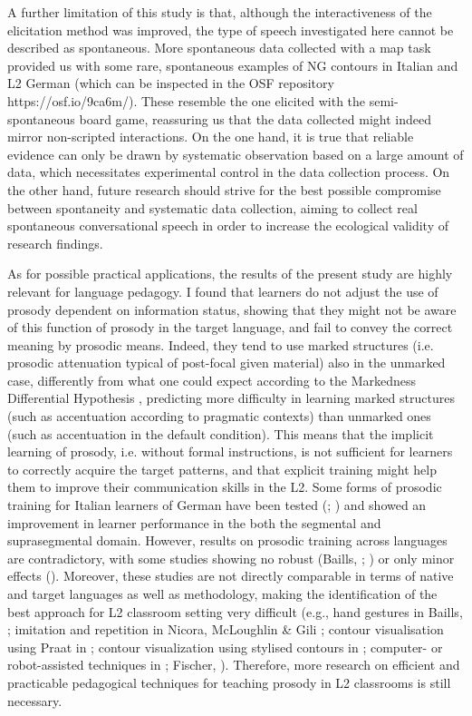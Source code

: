 A further limitation of this study is that, although the interactiveness of the elicitation method was improved, the type of speech investigated here cannot be described as spontaneous. More spontaneous data collected with a map task \citep{AndersonEtAl1991} provided us with some rare, spontaneous examples of NG contours in Italian and L2 German (which can be inspected in the OSF repository https://osf.io/9ca6m/). These resemble the one elicited with the semi-spontaneous board game, reassuring us that the data collected might indeed mirror non-scripted interactions. On the one hand, it is true that reliable evidence can only be drawn by systematic observation based on a large amount of data, which necessitates experimental control in the data collection process. On the other hand, future research should strive for the best possible compromise between spontaneity and systematic data collection, aiming to collect real spontaneous conversational speech in order to increase the ecological validity of research findings.

As for possible practical applications, the results of the present study are highly relevant for language pedagogy. I found that learners do not adjust the use of prosody dependent on information status, showing that they might not be aware of this function of prosody in the target language, and fail to convey the correct meaning by prosodic means. Indeed, they tend to use marked structures (i.e. prosodic attenuation typical of post-focal given material) also in the unmarked case, differently from what one could expect according to the Markedness Differential Hypothesis \citep{Eckman1977}, predicting more difficulty in learning marked structures (such as accentuation according to pragmatic contexts) than unmarked ones (such as accentuation in the default condition). This means that the implicit learning of prosody, i.e. without formal instructions, is not sufficient for learners to correctly acquire the target patterns, and that explicit training might help them to improve their communication skills in the L2. Some forms of prosodic training for Italian learners of German have been tested (\citealt{Dahmen2013}; \citealt{Missaglia2007}) and showed an improvement in learner performance in the both the segmental and suprasegmental domain. However, results on prosodic training across languages are contradictory, with some studies showing no robust (Baills, \citealt{Alazard-GuiuPrieto2022}; \citealt{Suter1976}) or only minor effects (\citealt{PurcellSuter1980}). Moreover, these studies are not directly comparable in terms of native and target languages as well as methodology, making the identification of the best approach for L2 classroom setting very difficult (e.g., hand gestures in Baills, \citealt{Alazard-GuiuPrieto2022}; imitation and repetition in Nicora, McLoughlin \& Gili \citealt{Fivela2018}; contour visualisation using Praat in \citealt{Smorenburg2015}; contour visualization using stylised contours in \citealt{NiebuhrEtAl2017}; computer- or robot-assisted techniques in \citealt{Bissiri2008}; Fischer, \citealt{NiebuhrAlm2021}). Therefore, more research on efficient and practicable pedagogical techniques for teaching prosody in L2 classrooms is still necessary.

